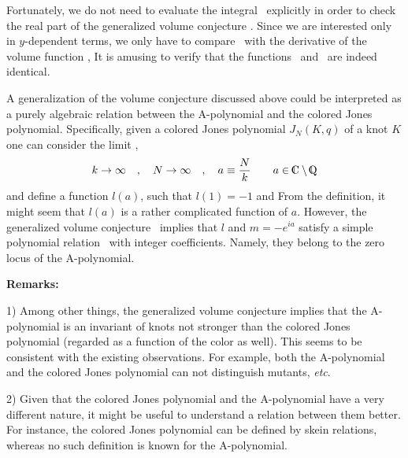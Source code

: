 Fortunately, we do not need to evaluate the integral \voleightint\
explicitly in order to check the real part
of the generalized volume conjecture \generalconj.
Since we are interested only in $y$-dependent terms,
we only have to compare \dvdy\ with the derivative of
the volume function \voleightint,
%
\eqn{}
%
It is amusing to verify that the functions \dvdy\ and \dvdycompare\
are indeed identical.




A generalization of the volume conjecture discussed above
could be interpreted as a purely algebraic relation between
the A-polynomial and the colored Jones polynomial.
Specifically, given a colored Jones polynomial $J_N (K,q)$
of a knot $K$ one can consider the limit \thelimit,
$$
k \to \infty
\quad , \quad
N \to \infty
\quad , \quad
a \equiv {N \over k}
\quad \quad a \in \IC \setminus \IQ
$$
and define a function $l(a)$, such that $l(1)=-1$ and
%
\eqn\lasalimit{
\log l = - {d \over da} \lim_{{N,k \to \infty \atop N/k=a}}
{\log J_N (K, e^{2 \pi i / k} ) \over k}
}
%
{}From the definition, it might seem that $l(a)$ is a rather
complicated function of $a$. However, the generalized volume
conjecture \generalconj\ implies that $l$ and $m=-e^{ia}$ satisfy
a simple polynomial relation \azerolocus\ with integer coefficients.
Namely, they belong to the zero locus of the A-polynomial.

\noindent
{\bf Remarks:}

\item{1)}
Among other things, the generalized volume conjecture implies that
the A-polynomial is an invariant of knots not stronger than the colored
Jones polynomial (regarded as a function of the color as well).
This seems to be consistent with the existing observations.
For example, both the A-polynomial and the colored Jones
polynomial can not distinguish mutants, {\it etc}.

\item{2)}
Given that the colored Jones polynomial and the A-polynomial
have a very different nature, it might be useful to understand
a relation between them better. For instance, the colored
Jones polynomial can be defined by skein relations, whereas
no such definition is known for the A-polynomial.

